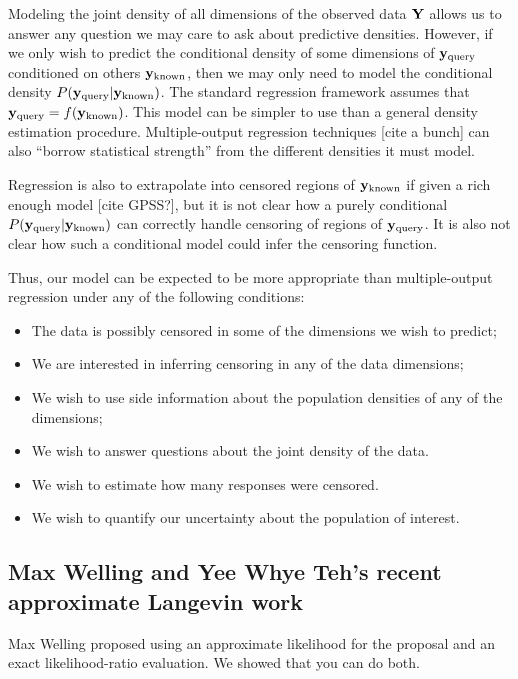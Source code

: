 \documentclass{article}
\begin{document}
Modeling the joint density of all dimensions of the observed data $\mathbf{Y}$ allows us to answer any question we may care to ask about predictive densities.  However, if we only wish to predict the conditional density of some dimensions of ${\bf{y}}_{\textrm{query}}$ conditioned on others ${\bf{y}}_{\textrm{known}}$, then we may only need to model the conditional density $P( {\bf{y}}_{\textrm{query}} | {\bf{y}}_{\textrm{known}})$.  The standard regression framework assumes that ${\bf{y}}_{\textrm{query}} = f({\bf{y}}_{\textrm{known}})$.  This model can be simpler to use than a general density estimation procedure.  Multiple-output regression techniques [cite a bunch] can also ``borrow statistical strength'' from the different densities it must model.

Regression is also to extrapolate into censored regions of ${\bf{y}}_{\textrm{known}}$ if given a rich enough model [cite GPSS?], but it is not clear how a purely conditional $P( {\bf{y}}_{\textrm{query}} | {\bf{y}}_{\textrm{known}})$ can correctly handle censoring of regions of ${\bf{y}}_{\textrm{query}}$.  It is also not clear how such a conditional model could infer the censoring function.

Thus, our model can be expected to be more appropriate than multiple-output regression under any of the following conditions:
\begin{itemize}
	\item The data is possibly censored in some of the dimensions we wish to predict;
	\item We are interested in inferring censoring in any of the data dimensions;
	\item We wish to use side information about the population densities of any of the dimensions;
	\item We wish to answer questions about the joint density of the data.
	\item We wish to estimate how many responses were censored.
	\item We wish to quantify our uncertainty about the population of interest.
\end{itemize}

\subsection{Max Welling and Yee Whye Teh's recent approximate Langevin work}

Max Welling proposed using an approximate likelihood for the proposal and an exact likelihood-ratio evaluation.  We showed that you can do both.
\end{document}
